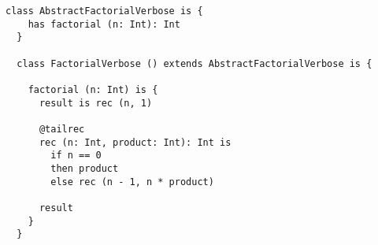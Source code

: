 \begin{lstlisting}[label={lst:exampleFactorialVerbose}]
  class AbstractFactorialVerbose is {
    has factorial (n: Int): Int
  }

  class FactorialVerbose () extends AbstractFactorialVerbose is {

    factorial (n: Int) is {
      result is rec (n, 1)

      @tailrec
      rec (n: Int, product: Int): Int is
        if n == 0
        then product
        else rec (n - 1, n * product)

      result
    }
  }
\end{lstlisting}



